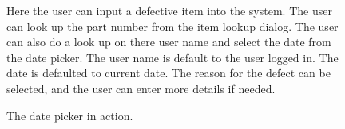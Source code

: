 \documentclass[16pt]{report}
\begin{document}
\begin{figure}[h!]
\caption{Here the user can input a defective item into the system.  The
user can look up the part number from the item lookup dialog.  The user
can also do a look up on there user name and select the date from the 
date picker.  The user name is default to the user logged in.  The date is
defaulted to current date.  The reason for the defect can be selected, 
and the user can enter more details if needed.}
\end{figure}

\begin{figure}[h!]
\caption{The date picker in action.}
\end{figure}
\end{document}
